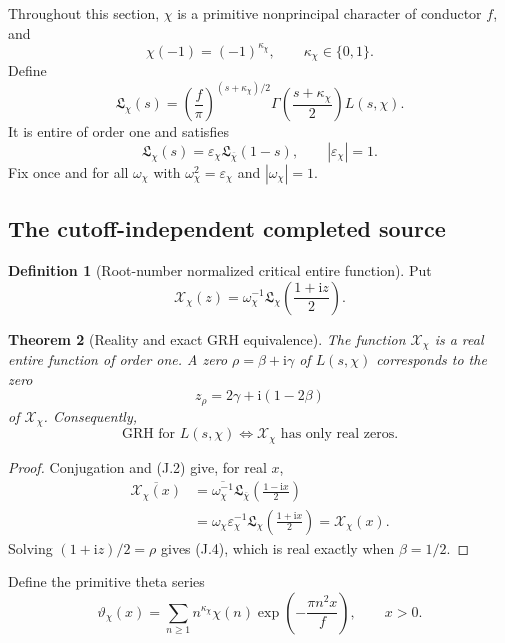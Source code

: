 \documentclass[11pt]{article}
\newtheorem{theorem}{Theorem}[section]
\theoremstyle{definition}
\newtheorem{definition}[theorem]{Definition}
\theoremstyle{remark}
\begin{document}
Throughout this section, $\chi$ is a primitive nonprincipal character of
conductor $f$, and
\[
 \chi(-1)=(-1)^{\kappa_\chi},
 \qquad \kappa_\chi\in\{0,1\}.
\]
Define
\[
 \mathfrak L_\chi(s)
 =\left(\frac f\pi\right)^{(s+\kappa_\chi)/2}
  \Gamma\!\left(\frac{s+\kappa_\chi}{2}\right)L(s,\chi).
 \tag{J.1}
\]
It is entire of order one and satisfies
\[
 \mathfrak L_\chi(s)
 =\varepsilon_\chi\mathfrak L_{\overline\chi}(1-s),
 \qquad |\varepsilon_\chi|=1.
 \tag{J.2}
\]
Fix once and for all $\omega_\chi$ with
$\omega_\chi^2=\varepsilon_\chi$ and $|\omega_\chi|=1$.

\subsection{The cutoff-independent completed source}

\begin{definition}[Root-number normalized critical entire function]
\label{def:theta-critical-entire}
Put
\[
 \boxed{
 \mathscr X_\chi(z)
 =\omega_\chi^{-1}
  \mathfrak L_\chi\!\left(\frac{1+\mathrm i z}{2}\right).}
 \tag{J.3}
\]
\end{definition}

\begin{theorem}[Reality and exact GRH equivalence]
\label{thm:theta-reality-GRH}
The function $\mathscr X_\chi$ is a real entire function of order one.  A
zero $\rho=\beta+\mathrm i\gamma$ of $L(s,\chi)$ corresponds to the zero
\[
 z_\rho=2\gamma+\mathrm i(1-2\beta)
 \tag{J.4}
\]
of $\mathscr X_\chi$.  Consequently,
\[
 \boxed{
 \text{GRH for }L(s,\chi)
 \iff \mathscr X_\chi\text{ has only real zeros}.}
 \tag{J.5}
\]
\end{theorem}

\begin{proof}
Conjugation and \textup{(J.2)} give, for real $x$,
\[
 \begin{aligned}
 \overline{\mathscr X_\chi(x)}
 &=\overline{\omega_\chi^{-1}}
   \mathfrak L_{\overline\chi}
   \!\left(\frac{1-\mathrm i x}{2}\right)\\
 &=\omega_\chi\varepsilon_\chi^{-1}
   \mathfrak L_\chi
   \!\left(\frac{1+\mathrm i x}{2}\right)
 =\mathscr X_\chi(x).
 \end{aligned}
\]
Solving $(1+\mathrm i z)/2=\rho$ gives \textup{(J.4)}, which is real exactly
when $\beta=1/2$.
\end{proof}

Define the primitive theta series
\[
 \vartheta_\chi(x)
 =\sum_{n\ge1}n^{\kappa_\chi}\chi(n)
  \exp\!\left(-\frac{\pi n^2x}{f}\right),
 \qquad x>0.
 \tag{J.6}
\]
\end{document}
